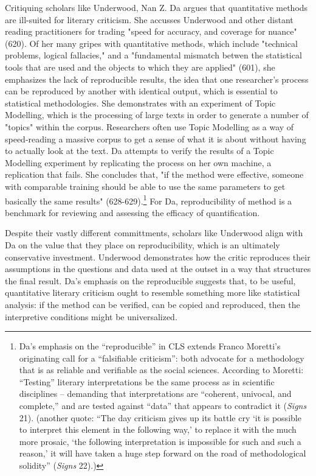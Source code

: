 \documentclass[11pt]{article}
\begin{document}
Critiquing scholars like Underwood, Nan Z. Da argues that quantitative
methods are ill-suited for literary criticism. She accusses Underwood
and other distant reading practitioners for trading "speed for
accuracy, and coverage for nuance" (620). Of her many gripes with
quantitative methods, which include "technical problems, logical
fallacies," and a "fundamental mismatch betwen the statistical tools
that are used and the objects to which they are applied" (601), she
emphasizes the lack of reproducible results, the idea that one
researcher's process can be reproduced by another with identical
output, which is essential to statistical methodologies. She
demonstrates with an experiment of Topic Modelling, which is the
processing of large texts in order to generate a number of "topics"
within the corpus. Researchers often use Topic Modelling as a way of
speed-reading a massive corpus to get a sense of what it is about
without having to actually look at the text. Da attempts to verify the
results of a Topic Modelling experiment by replicating the process on
her own machine, a replication that fails. She concludes that, "if the
method were effective, someone with comparable training should be able
to use the same parameters to get basically the same results"
(628-629).\footnote{Da's emphasis on the “reproducible” in CLS extends Franco
Moretti's originating call for a “falsifiable criticism”: both
advocate for a methodology that is as reliable and verifiable as the
social sciences. According to Moretti: “Testing” literary
interpretations be the same process as in scientific disciplines --
demanding that interpretations are “coherent, univocal, and complete,”
and are tested against “data” that appears to contradict it (\emph{Signs}
21). (another quote: “The day criticism gives up its battle cry ‘it is
possible to interpret this element in the following way,’ to replace
it with the much more prosaic, ‘the following interpretation is
impossible for such and such a reason,’ it will have taken a huge step
forward on the road of methodological solidity” (\emph{Signs} 22).)} For Da, reproducibility of method is a benchmark for
reviewing and assessing the efficacy of quantification.

Despite their vastly different committments, scholars like Underwood
align with Da on the value that they place on reproducibility, which
is an ultimately conservative investment. Underwood demonstrates how
the critic reproduces their assumptions in the questions and data used
at the outset in a way that structures the final result. Da's emphasis
on the reproducible suggests that, to be useful, quantitative literary
criticism ought to resemble something more like statistical analysis:
if the method can be verified, can be copied and reproduced, then the
interpretive conditions might be universalized. 
\end{document}
